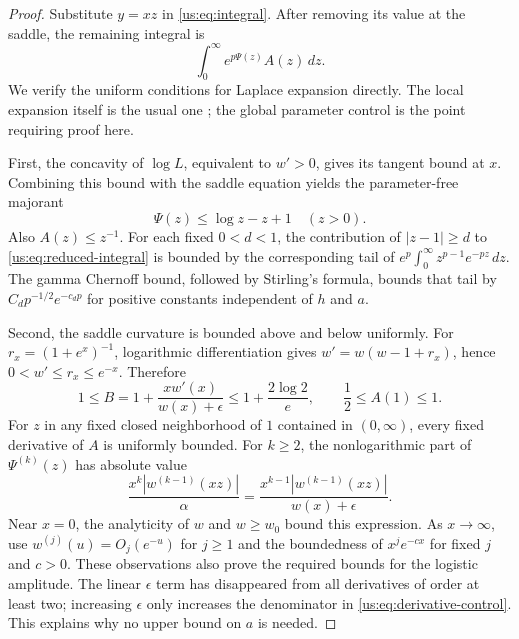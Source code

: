 \begin{proof}
Substitute $y=xz$ in \eqref{us:eq:integral}. After removing its
value at the saddle, the remaining integral is
\begin{equation}\label{us:eq:reduced-integral}
 \int_0^\infty e^{p\Psi(z)}A(z)\,dz.
\end{equation}
We verify the uniform conditions for Laplace expansion directly.
The local expansion itself is the usual one
\cite[\S2.3(iii)]{cont:DLMFLaplace}; the global parameter control is
the point requiring proof here.

First, the concavity of $\log L$, equivalent to $w'>0$, gives its
tangent bound at $x$. Combining this bound with the saddle equation
yields the parameter-free majorant
\begin{equation}\label{us:eq:majorant}
 \boxed{\displaystyle \Psi(z)\le\log z-z+1\quad(z>0).}
\end{equation}
Also $A(z)\le z^{-1}$. For each fixed $0<d<1$, the contribution
of $|z-1|\ge d$ to \eqref{us:eq:reduced-integral} is bounded by
the corresponding tail of
$e^p\int_0^\infty z^{p-1}e^{-pz}\,dz$.
The gamma Chernoff bound, followed by Stirling's formula, bounds
that tail by $C_dp^{-1/2}e^{-c_dp}$ for positive constants
independent of $h$ and $a$.

Second, the saddle curvature is bounded above and below uniformly.
For $r_x=(1+e^x)^{-1}$, logarithmic differentiation gives
$w'=w(w-1+r_x)$, hence $0<w'\le r_x\le e^{-x}$.
Therefore
\begin{equation}\label{us:eq:curvature-bound}
 1\le B=1+\frac{xw'(x)}{w(x)+\epsilon}
 \le1+\frac{2\log2}{e},
 \qquad \frac12\le A(1)\le1.
\end{equation}
For $z$ in any fixed closed neighborhood of $1$ contained in
$(0,\infty)$, every fixed derivative of $A$ is uniformly bounded.
For $k\ge2$, the nonlogarithmic part of $\Psi^{(k)}(z)$ has
absolute value
\begin{equation}\label{us:eq:derivative-control}
 \frac{x^k|w^{(k-1)}(xz)|}{\alpha}
 =\frac{x^{k-1}|w^{(k-1)}(xz)|}{w(x)+\epsilon}.
\end{equation}
Near $x=0$, the analyticity of $w$ and $w\ge w_0$ bound this
expression. As $x\to\infty$, use
$w^{(j)}(u)=O_j(e^{-u})$ for $j\ge1$ and the boundedness of
$x^je^{-cx}$ for fixed $j$ and $c>0$. These observations also
prove the required bounds for the logistic amplitude. The linear
$\epsilon$ term has disappeared from all derivatives of order
at least two; increasing $\epsilon$ only increases the denominator
in \eqref{us:eq:derivative-control}. This explains why no upper
bound on $a$ is needed.


\end{proof}
